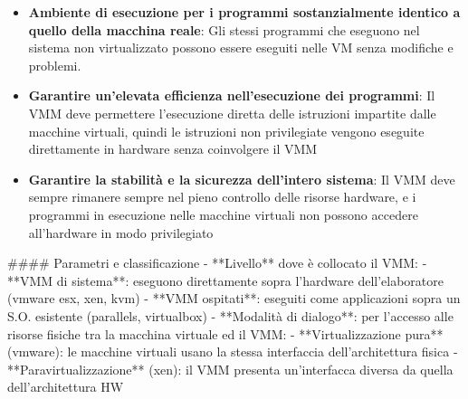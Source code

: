 \documentclass{article}
\begin{document}
\begin{itemize}
    \item \textbf{Ambiente di esecuzione per i programmi sostanzialmente identico a quello della macchina reale}: Gli stessi programmi che eseguono nel sistema non virtualizzato possono essere eseguiti nelle VM
    senza modifiche e problemi.
    \item \textbf{Garantire un'elevata efficienza nell'esecuzione dei programmi}: Il VMM deve permettere l'esecuzione diretta delle istruzioni impartite dalle macchine virtuali, quindi le istruzioni non 
    privilegiate vengono eseguite direttamente in hardware senza coinvolgere il VMM
    \item \textbf{Garantire la stabilità e la sicurezza dell'intero sistema}: Il VMM deve sempre rimanere sempre nel pieno controllo delle risorse hardware, e i programmi in  esecuzione nelle macchine virtuali non possono 
    accedere all'hardware in modo privilegiato
\end{itemize}

#### Parametri e classificazione
- **Livello** dove è collocato il VMM:
    - **VMM di sistema**: eseguono direttamente sopra l'hardware dell'elaboratore (vmware esx, xen, kvm)
    - **VMM ospitati**: eseguiti come applicazioni sopra un S.O. esistente (parallels, virtualbox)
- **Modalità di dialogo**: per l'accesso alle risorse fisiche tra la macchina virtuale ed il VMM:
    - **Virtualizzazione pura** (vmware): le macchine virtuali usano la stessa interfaccia 
    dell'architettura fisica
    - **Paravirtualizzazione** (xen): il VMM presenta un'interfacca diversa da quella dell'architettura HW
\end{document}
